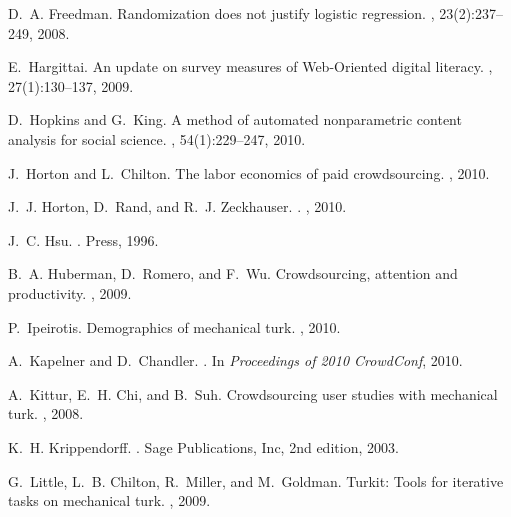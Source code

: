 \documentclass{cscw2010}
\begin{document}
\begin{thebibliography}{10}
D.~A. Freedman.
\newblock Randomization does not justify logistic regression.
, 23(2):237--249, 2008.

E.~Hargittai.
\newblock An update on survey measures of {Web-Oriented} digital literacy.
, 27(1):130--137, 2009.

D.~Hopkins and G.~King.
\newblock A method of automated nonparametric content analysis for social
  science.
, 54(1):229--247, 2010.

J.~Horton and L.~Chilton.
\newblock The labor economics of paid crowdsourcing.
,
  2010.

J.~J. Horton, D.~Rand, and R.~J. Zeckhauser.
.
, 2010.

J.~C. Hsu.
.
 Press, 1996.

B.~A. Huberman, D.~Romero, and F.~Wu.
\newblock Crowdsourcing, attention and productivity.
, 2009.

P.~Ipeirotis.
\newblock Demographics of mechanical turk.
, 2010.

A.~Kapelner and D.~Chandler.
.
\newblock In {\em Proceedings of 2010 CrowdConf}, 2010.

A.~Kittur, E.~H. Chi, and B.~Suh.
\newblock Crowdsourcing user studies with mechanical turk.
, 2008.

K.~H. Krippendorff.
.
\newblock Sage Publications, Inc, 2nd edition, 2003.

G.~Little, L.~B. Chilton, R.~Miller, and M.~Goldman.
\newblock Turkit: Tools for iterative tasks on mechanical turk.
, 2009.


\end{thebibliography}
\end{document}
